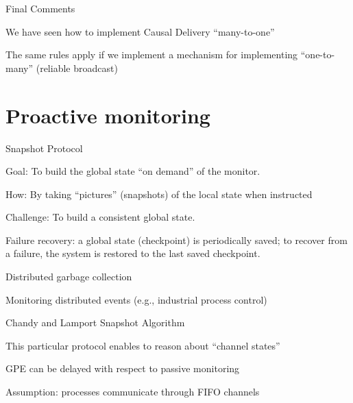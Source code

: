 \begin{frame}{Final Comments}
\BIL
\item We have seen how to implement Causal Delivery ``many-to-one'' 
\item The same rules apply if we implement a mechanism for 
  implementing ``one-to-many'' (reliable broadcast)
\EIL
\end{frame}

\section{Proactive monitoring}

\begin{frame}{Snapshot Protocol}

\BI
\item \alert{Goal}:
To build the global state “on demand” of the monitor.
\item \alert{How}:
By taking ``pictures'' (snapshots) of the local state when instructed
\item \alert{Challenge}:
To build a consistent global state.
\EI

\BI
\item Failure recovery: a global state (\alert{checkpoint}) is periodically saved; 
  to recover from a failure, the system is restored to the last saved
  checkpoint.
\item Distributed garbage collection
\item Monitoring distributed events (e.g., industrial process control)
\EI
\end{frame}

\begin{frame}{Chandy and Lamport Snapshot Algorithm}

\BI
\item This particular protocol enables to reason about ``channel states''
\item GPE can be delayed with respect to passive monitoring
\item Assumption: processes communicate through FIFO channels
\EI

\end{frame}

